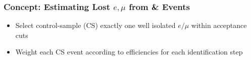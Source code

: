 \documentclass{beamer}
\begin{document}
\begin{frame}
\frametitle{Concept: Estimating Lost $e,\mu$ from \wpj \& \ttbar Events}
 \begin{center}
 \end{center}
  \begin{itemize}
  \item Select control-sample (CS) exactly one well isolated $e/\mu$ within acceptance cuts
  \item Weight each CS event according to efficiencies for each identification step
 \end{itemize}
\end{frame}
\end{document}
